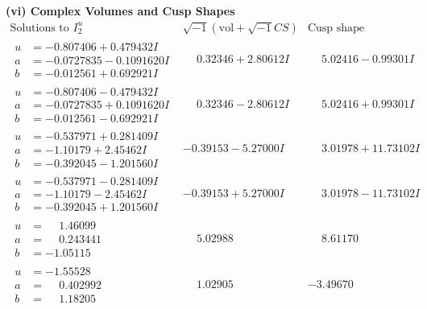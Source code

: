 \documentclass[1p]{elsarticle_modified}
\theoremstyle{definition}
\newcommand{\I}{\sqrt{-1}}
\begin{document}
\newpage\flushleft \textbf{(vi) Complex Volumes and Cusp Shapes}
$$\begin{array}{c|c|c}  
\text{Solutions to }I^u_{2}& \I (\text{vol} + \sqrt{-1}CS) & \text{Cusp shape}\\
 \hline 
\begin{aligned}
u &= -0.807406 + 0.479432 I \\
a &= -0.0727835 - 0.1091620 I \\
b &= -0.012561 + 0.692921 I\end{aligned}
 & \phantom{-}0.32346 + 2.80612 I & \phantom{-}5.02416 - 0.99301 I \\ \hline\begin{aligned}
u &= -0.807406 - 0.479432 I \\
a &= -0.0727835 + 0.1091620 I \\
b &= -0.012561 - 0.692921 I\end{aligned}
 & \phantom{-}0.32346 - 2.80612 I & \phantom{-}5.02416 + 0.99301 I \\ \hline\begin{aligned}
u &= -0.537971 + 0.281409 I \\
a &= -1.10179 + 2.45462 I \\
b &= -0.392045 - 1.201560 I\end{aligned}
 & -0.39153 - 5.27000 I & \phantom{-}3.01978 + 11.73102 I \\ \hline\begin{aligned}
u &= -0.537971 - 0.281409 I \\
a &= -1.10179 - 2.45462 I \\
b &= -0.392045 + 1.201560 I\end{aligned}
 & -0.39153 + 5.27000 I & \phantom{-}3.01978 - 11.73102 I \\ \hline\begin{aligned}
u &= \phantom{-}1.46099\phantom{ +0.000000I} \\
a &= \phantom{-}0.243441\phantom{ +0.000000I} \\
b &= -1.05115\phantom{ +0.000000I}\end{aligned}
 & \phantom{-}5.02988\phantom{ +0.000000I} & \phantom{-}8.61170\phantom{ +0.000000I} \\ \hline\begin{aligned}
u &= -1.55528\phantom{ +0.000000I} \\
a &= \phantom{-}0.402992\phantom{ +0.000000I} \\
b &= \phantom{-}1.18205\phantom{ +0.000000I}\end{aligned}
 & \phantom{-}1.02905\phantom{ +0.000000I} & -3.49670\phantom{ +0.000000I} \\ \hline\begin{aligned}

\end{aligned}
\end{array}$$
\end{document}
